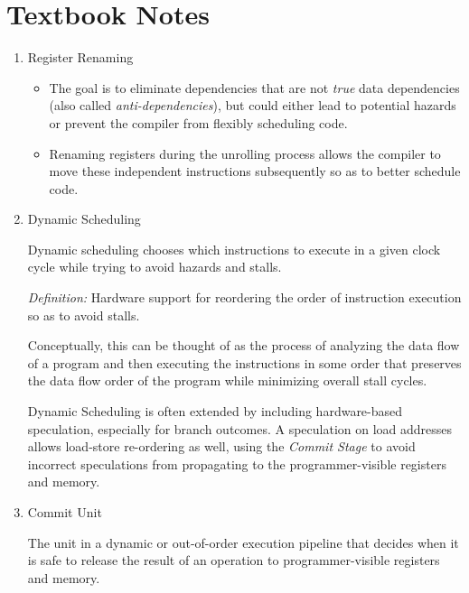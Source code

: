 \documentclass[12pt]{article}
\newenvironment{QandA}{\begin{enumerate}[label=\bfseries\arabic*.]\bfseries}
                      {\end{enumerate}}
\newenvironment{answered}{\par\quad\normalfont}{}
\begin{document}
\newpage 

\section{Textbook Notes}

\begin{QandA}
\item Register Renaming
\begin{answered}
\vspace{-0.85cm}
\begin{itemize}
    \item The goal is to eliminate dependencies that are not \textit{true} data dependencies (also called \textit{anti-dependencies}), but could either lead to potential hazards or prevent the compiler from flexibly scheduling code.
    \item Renaming registers during the unrolling process allows the compiler to move these independent instructions subsequently so as to better schedule code.
\end{itemize}
\end{answered}

\item Dynamic Scheduling
\begin{answered}
Dynamic scheduling chooses which instructions to execute in a given clock cycle while trying to avoid hazards and stalls. 

\textit{Definition:} Hardware support for reordering the order of instruction execution so as to avoid stalls. 

Conceptually, this can be thought of as the process of analyzing the data flow of a program and then executing the instructions in some order that preserves the data flow order of the program while minimizing overall stall cycles. 

Dynamic Scheduling is often extended by including hardware-based speculation, especially for branch outcomes. A speculation on load addresses allows load-store re-ordering as well, using the \textit{Commit Stage} to avoid incorrect speculations from propagating to the programmer-visible registers and memory. 
\end{answered}

\item Commit Unit
\begin{answered}
The unit in a dynamic or out-of-order execution pipeline that decides when it is safe to release the result of an operation to programmer-visible registers and memory.
\end{answered}


\end{QandA}
\end{document}

